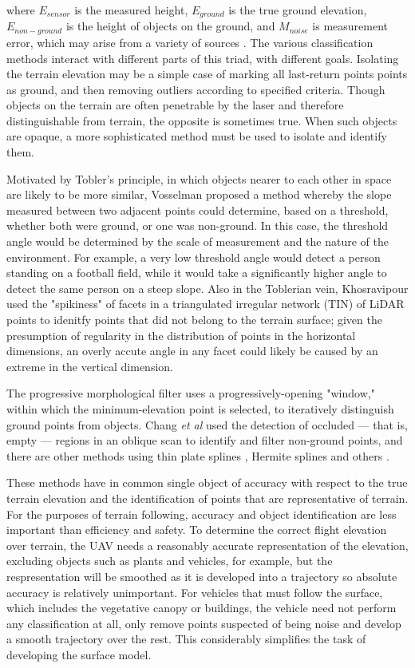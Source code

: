 \documentclass[10pt]{report}
\begin{document}
where $E_{sensor}$ is the measured height, $E_{ground}$ is the true ground elevation, $E_{non-ground}$ is the height of objects on the ground, and $M_{noise}$ is measurement error, which may arise from a variety of sources \cite{Meng2010}. The various classification methods interact with different parts of this triad, with different goals. Isolating the terrain elevation may be a simple case of marking all last-return points points as ground, and then removing outliers according to specified criteria. Though objects on the terrain are often penetrable by the laser and therefore distinguishable from terrain, the opposite is sometimes true. When such objects are opaque, a more sophisticated method must be used to isolate and identify them.

Motivated by Tobler's principle, in which objects nearer to each other in space are likely to be more similar, Vosselman \cite{Vosselman2000} proposed a method whereby the slope measured between two adjacent points could determine, based on a threshold, whether both were ground, or one was non-ground. In this case, the threshold angle would be determined by the scale of measurement and the nature of the environment. For example, a very low threshold angle would detect a person standing on a football field, while it would take a significantly higher angle to detect the same person on a steep slope. Also in the Toblerian vein, Khosravipour \cite{Khosravipour2016} used the "spikiness" of facets in a triangulated irregular network (TIN) of LiDAR points to idenitfy points that did not belong to the terrain surface; given the presumption of regularity in the distribution of points in the horizontal dimensions, an overly accute angle in any facet could likely be caused by an extreme in the vertical dimension. 

The progressive morphological filter \cite{Zhang2003} uses a progressively-opening "window," within which the minimum-elevation point is selected, to iteratively distinguish ground points from objects. Chang \emph{et al} \cite{Chang2008} used the detection of occluded --- that is, empty --- regions in an oblique scan to identify and filter non-ground points, and there are other methods using thin plate splines \cite{Hudak2012}, Hermite splines \cite{Silvan-Cardenas2006} and others \cite{Hodgson2005,Zheng2007,Zhang2005}.

These methods have in common single object of accuracy with respect to the true terrain elevation and the identification of points that are representative of terrain. For the purposes of terrain following, accuracy and object identification are less important than efficiency and safety. To determine the correct flight elevation over terrain, the UAV needs a reasonably accurate representation of the elevation, excluding objects such as plants and vehicles, for example, but the respresentation will be smoothed as it is developed into a trajectory so absolute accuracy is relatively unimportant. For vehicles that must follow the surface, which includes the vegetative canopy or buildings, the vehicle need not perform any classification at all, only remove points suspected of being noise and develop a smooth trajectory over the rest. This considerably simplifies the task of developing the surface model.
\end{document}
